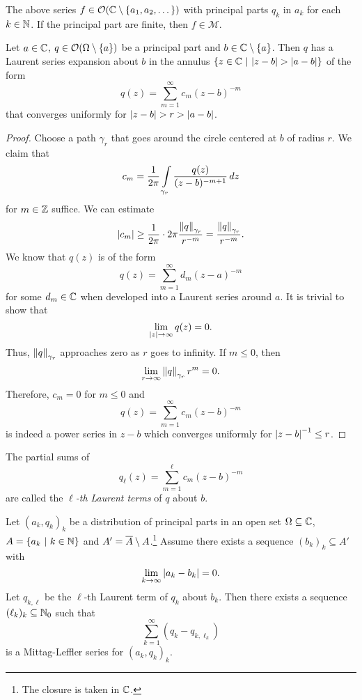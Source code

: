 \begin{opomba}
The above series
$f \in \mathcal{O}(\mathbb{C} \setminus \left\{a_1, a_2, \dots\right\})$ with
principal parts $q_k$ in $a_k$ for each $k \in \mathbb{N}$. If the
principal part are finite, then $f \in \mathcal{M}$.
\end{opomba}

\begin{lema}
Let $a \in \mathbb{C}$, $q \in \mathcal{O} (\Omega \setminus \left\{a\right\})$ be a
principal part and $b \in \mathbb{C} \setminus \left\{a\right\}$. Then $q$ has a
Laurent series expansion about $b$ in the annulus
$\left\{z \in \mathbb{C}~\middle\vert~\left\lvert z - b\right\rvert > \left\lvert a - b\right\rvert\right\}$ of the form
\[
q(z) = \sum_{m=1}^\infty c_m (z-b)^{-m}
\]
that converges uniformly for $\left\lvert z - b\right\rvert > r > \left\lvert a - b\right\rvert$.
\end{lema}

\begin{proof}
Choose a path $\gamma_r$ that goes around the circle centered at
$b$ of radius $r$. We claim that
\[
c_m =
\frac{1}{2 \pi} \int\limits_{\gamma_r} \frac{q(z)}{(z-b)^{-m+1}}\,dz
\]
for $m \in \mathbb{Z}$ suffice. We can estimate
\[
\left\lvert c_m\right\rvert \geq
\frac{1}{2 \pi} \cdot 2 \pi \frac{\left\lVert q\right\rVert_{\gamma_r}}{r^{- m}} =
\frac{\left\lVert q\right\rVert_{\gamma_r}}{r^{-m}}.
\]
We know that $q(z)$ is of the form
\[
q(z) = \sum_{m = 1}^{\infty} d_m (z - a)^{-m}
\]
for some $d_m \in \mathbb{C}$ when developed into a Laurent series around
$a$. It is trivial to show that
\[
\lim_{\left\lvert z\right\rvert\to \infty}q(z) = 0.
\]
Thus, $\left\lVert q\right\rVert_{\gamma_r}$ approaches zero as $r$ goes to
infinity. If $m \leq 0$, then
\[
\lim_{r \to \infty} \left\lVert q\right\rVert_{\gamma_r} r^{m} = 0.
\]
Therefore, $c_m = 0$ for $m \leq 0$ and
\[
q(z) = \sum_{m = 1}^{\infty} c_m (z - b)^{ - m}
\]
is indeed a power series in $z-b$ which converges uniformly for
$\left\lvert z - b\right\rvert^{-1} \leq r$.
\end{proof}

\begin{definicija}
The partial sums of
\[
q_\ell(z) = \sum_{m = 1}^{\ell} c_m (z - b)^{ - m}
\]
are called the
\emph{$\ell$-th Laurent terms} of $q$ about
$b$.
\end{definicija}

\begin{lema}
\label{inf_prod:lm:sufficientForML}
Let $(a_k, q_k)_k$ be a distribution of principal parts in an open
set $\Omega \subseteq \mathbb{C}$, $A = \left\{a_k~\middle\vert~k \in \mathbb{N}\right\}$ and
$A' = \overline{A} \setminus A$.\footnote{The closure is taken in
$\mathbb{C}$.} Assume there exists a sequence $(b_k)_k \subseteq A'$ with
\[
\lim_{k \to \infty} \left\lvert a_k - b_k\right\rvert = 0.
\]
Let $q_{k, \ell}$ be the $\ell$-th Laurent term of $q_k$ about
$b_k$. Then there exists a sequence $(\ell_k)_k \subseteq \mathbb{N}_0$
such that
\[
\sum_{k=1}^{\infty}(q_k - q_{k, \ell_k})
\]
is a Mittag-Leffler series for $(a_k, q_k)_k$.
\end{lema}

